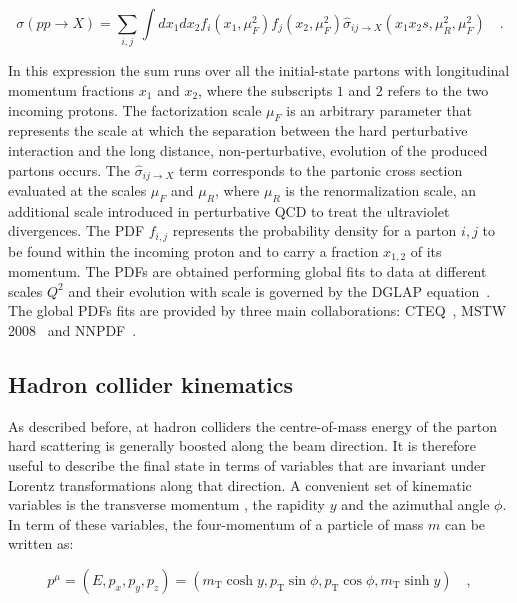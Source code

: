 \begin{equation}
\sigma(pp \to X) = \sum_{i,j} \int dx_1 dx_2 f_{i}(x_1,\mu_F^2)f_{j}(x_2,\mu_F^2)\hat{\sigma}_{ij\to X}(x_1 x_2 s, \mu_R^2, \mu_F^2) \quad .
\end{equation}

In this expression the sum runs over all the initial-state partons with longitudinal momentum fractions $x_1$ and $x_2$, where the subscripts $1$ and $2$ refers to the two incoming protons. The factorization scale $\mu_F$ is an arbitrary parameter that represents the scale at which the separation between the hard perturbative interaction and the long distance, non-perturbative, evolution of the produced partons occurs. The $\hat{\sigma}_{ij\to X}$ term corresponds to the partonic cross section evaluated at the scales $\mu_F$ and $\mu_R$, where $\mu_R$ is the renormalization scale, an additional scale introduced in perturbative QCD to treat the ultraviolet divergences. The PDF $f_{i,j}$ represents the probability density for a parton $i,j$ to be found within the incoming proton and to carry a fraction $x_{1,2}$ of its momentum. The PDFs are obtained performing global fits to data at different scales $Q^2$ and their evolution with scale is governed by the DGLAP equation~\cite{Altarelli:1977zs}. The global PDFs fits are provided by three main collaborations: CTEQ~\cite{Nadolsky:2008zw}, MSTW 2008~\cite{Watt:2011kp} and NNPDF~\cite{Ball:2013hta}.



\subsection{Hadron collider kinematics}\label{sec:pp_kin}

As described before, at hadron colliders the centre-of-mass energy of the parton hard scattering is generally boosted along the beam direction. It is therefore useful to describe the final state in terms of variables that are invariant under Lorentz transformations along that direction. A convenient set of kinematic variables is the transverse momentum \pt, the rapidity $y$ and the azimuthal angle $\phi$. In term of these variables, the four-momentum of a particle of mass $m$ can be written as:

\begin{equation}
p^\mu = (E, p_x, p_y, p_z) = (m_\mathrm{T}\cosh y, p_\mathrm{T}\sin\phi, p_\mathrm{T}\cos\phi, m_\mathrm{T}\sinh y) \quad ,
\end{equation}

